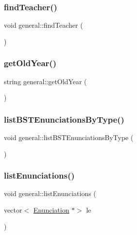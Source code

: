 \mbox{\label{classgeneral_aaccf7ec238e4fb8f4f2430631764e87d}} 
\subsubsection{\texorpdfstring{find\+Teacher()}{findTeacher()}}
{\footnotesize\ttfamily void general\+::find\+Teacher (\begin{DoxyParamCaption}{ }\end{DoxyParamCaption})}

\mbox{\label{classgeneral_a8b4c7609872e3559702838a12f210742}} 
\subsubsection{\texorpdfstring{get\+Old\+Year()}{getOldYear()}}
{\footnotesize\ttfamily string general\+::get\+Old\+Year (\begin{DoxyParamCaption}{ }\end{DoxyParamCaption})}

\mbox{\label{classgeneral_a551a81d21f47c57dfff3ab05b834ea45}} 
\subsubsection{\texorpdfstring{list\+B\+S\+T\+Enunciations\+By\+Type()}{listBSTEnunciationsByType()}}
{\footnotesize\ttfamily void general\+::list\+B\+S\+T\+Enunciations\+By\+Type (\begin{DoxyParamCaption}{ }\end{DoxyParamCaption})}

\mbox{\label{classgeneral_a2e8fee17772bc0ac04febd375ef98828}} 
\subsubsection{\texorpdfstring{list\+Enunciations()}{listEnunciations()}}
{\footnotesize\ttfamily void general\+::list\+Enunciations (\begin{DoxyParamCaption}\item[{vector$<$ \hyperlink{class_enunciation}{Enunciation} $\ast$$>$}]{le }\end{DoxyParamCaption})}

